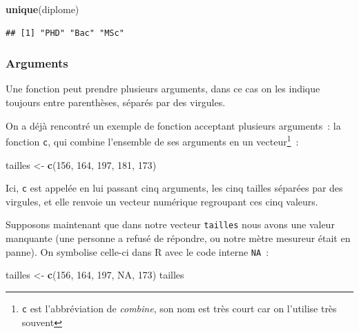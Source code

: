 \documentclass[
  12pt,
]{book}
\newenvironment{Shaded}{\begin{snugshade}}{\end{snugshade}}
\newcommand{\DecValTok}[1]{\textcolor[rgb]{0.00,0.00,0.81}{#1}}
\newcommand{\KeywordTok}[1]{\textcolor[rgb]{0.13,0.29,0.53}{\textbf{#1}}}
\newcommand{\NormalTok}[1]{#1}
\newcommand{\OtherTok}[1]{\textcolor[rgb]{0.56,0.35,0.01}{#1}}
\newcommand{\StringTok}[1]{\textcolor[rgb]{0.31,0.60,0.02}{#1}}
\begin{document}
\begin{Shaded}
\begin{Highlighting}[]
\KeywordTok{unique}\NormalTok{(diplome)}
\end{Highlighting}
\end{Shaded}

\begin{verbatim}
## [1] "PHD" "Bac" "MSc"
\end{verbatim}

\hypertarget{arguments}{%
\subsubsection{Arguments}\label{arguments}}

Une fonction peut prendre plusieurs arguments, dans ce cas on les indique toujours entre parenthèses, séparés par des virgules.

On a déjà rencontré un exemple de fonction acceptant plusieurs arguments~: la fonction \texttt{c}, qui combine l'ensemble de ses arguments en un vecteur\footnote{\texttt{c} est l'abbréviation de \emph{combine}, son nom est très court car on l'utilise très souvent}~:

\begin{Shaded}
\begin{Highlighting}[]
\NormalTok{tailles \textless{}{-}}\StringTok{ }\KeywordTok{c}\NormalTok{(}\DecValTok{156}\NormalTok{, }\DecValTok{164}\NormalTok{, }\DecValTok{197}\NormalTok{, }\DecValTok{181}\NormalTok{, }\DecValTok{173}\NormalTok{)}
\end{Highlighting}
\end{Shaded}

Ici, \texttt{c} est appelée en lui passant cinq arguments, les cinq tailles séparées par des virgules, et elle renvoie un vecteur numérique regroupant ces cinq valeurs.

Supposons maintenant que dans notre vecteur \texttt{tailles} nous avons une valeur manquante (une personne a refusé de répondre, ou notre mètre mesureur était en panne). On symbolise celle-ci dans R avec le code interne \texttt{NA}~:

\begin{Shaded}
\begin{Highlighting}[]
\NormalTok{tailles \textless{}{-}}\StringTok{ }\KeywordTok{c}\NormalTok{(}\DecValTok{156}\NormalTok{, }\DecValTok{164}\NormalTok{, }\DecValTok{197}\NormalTok{, }\OtherTok{NA}\NormalTok{, }\DecValTok{173}\NormalTok{)}
\NormalTok{tailles}
\end{Highlighting}
\end{Shaded}
\end{document}
